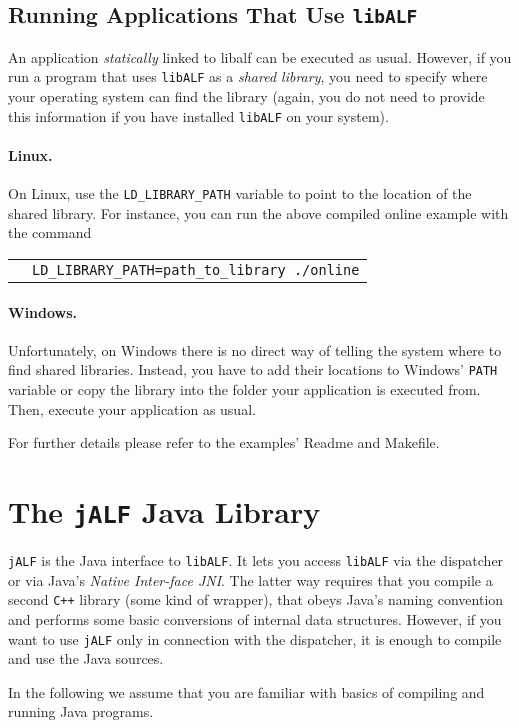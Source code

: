 \documentclass[a4paper, fontsize=11pt, DIV=12, parskip=half]{scrartcl}
\newcommand{\libalf}{\texttt{libALF}\xspace}
\newcommand{\jalf}{\texttt{jALF}\xspace}
\newcommand{\cpp}{\texttt{C+$\!$+}\xspace}
\newcommand{\cmd}[1]{
\begin{tabular}{p{.025\textwidth}l}
&\begin{minipage}{.85\textwidth}\texttt{#1}\end{minipage}
\end{tabular}
}
\begin{document}
\subsection{Running Applications That Use \libalf}
An application \emph{statically} linked to libalf can be executed as usual. However, if you run a program that uses \libalf as a \emph{shared library}, you need to specify where your operating system can find the library (again, you do not need to provide this information if you have installed \libalf on your system).

\paragraph{Linux.}
On Linux, use the \texttt{LD\_LIBRARY\_PATH} variable to point to the location of the shared library. For instance, you can run the above compiled online example with the command

\cmd{LD\_LIBRARY\_PATH=path\_to\_library ./online}

\paragraph{Windows.}
Unfortunately, on Windows there is no direct way of telling the system where to find shared libraries. Instead, you have to add their locations to Windows' \texttt{PATH} variable or copy the library into the folder your application is executed from. Then, execute your application as usual.

For further details please refer to the examples' Readme and Makefile.

\section{\texorpdfstring{The \jalf Java Library}{The jALF Java Library}}\label{sec:jalf}
\jalf is the Java interface to \libalf. It lets you access \libalf via the dispatcher or via Java's \emph{Native Inter-face JNI}. The latter way requires that you compile a second \cpp library (some kind of wrapper), that obeys Java's naming convention and performs some basic conversions of internal data structures. However, if you want to use \jalf only in connection with the dispatcher, it is enough to compile and use the Java sources.

In the following we assume that you are familiar with basics of compiling and running Java programs.
\end{document}
